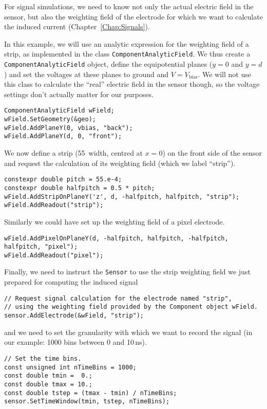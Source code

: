 For signal simulations, 
we need to know not only the actual electric field in the sensor, 
but also the weighting field of the electrode for which we want to 
calculate the induced current (Chapter~\ref{Chap:Signals}).

In this example, 
we will use an analytic expression for the weighting field of a strip, 
as implemented in the class \texttt{ComponentAnalyticField}. 
We thus create a \texttt{ComponentAnalyticField} object, 
define the equipotential planes ($y = 0$ and $y = d$) 
and set the voltages at these planes to ground and $V = V_{\text{bias}}$. 
We will not use this class to calculate the ``real'' electric field 
in the sensor though, so the voltage settings don't actually matter 
for our purposes.
\begin{lstlisting}
ComponentAnalyticField wField;
wField.SetGeometry(&geo);
wField.AddPlaneY(0, vbias, "back");
wField.AddPlaneY(d, 0, "front");
\end{lstlisting}
We now define a strip (55\, width, centred at $x = 0$) 
on the front side of the sensor and request the calculation of its 
weighting field (which we label ``strip'').
\begin{lstlisting}
constexpr double pitch = 55.e-4;
constexpr double halfpitch = 0.5 * pitch;
wField.AddStripOnPlaneY('z', d, -halfpitch, halfpitch, "strip");
wField.AddReadout("strip");
\end{lstlisting}
Similarly we could have set up the weighting field of a pixel electrode.
\begin{lstlisting}
wField.AddPixelOnPlaneY(d, -halfpitch, halfpitch, -halfpitch, halfpitch, "pixel");
wField.AddReadout("pixel");
\end{lstlisting}

Finally, we need to instruct the \texttt{Sensor} 
to use the strip weighting field we just prepared 
for computing the induced signal
\begin{lstlisting}
// Request signal calculation for the electrode named "strip",
// using the weighting field provided by the Component object wField.
sensor.AddElectrode(&wField, "strip");
\end{lstlisting}
and we need to set the granularity with which we want to record the signal 
(in our example: 1000 bins between 0 and 10\,ns).

\begin{lstlisting}
// Set the time bins.
const unsigned int nTimeBins = 1000;
const double tmin =  0.;
const double tmax = 10.;
const double tstep = (tmax - tmin) / nTimeBins;
sensor.SetTimeWindow(tmin, tstep, nTimeBins);
\end{lstlisting}

